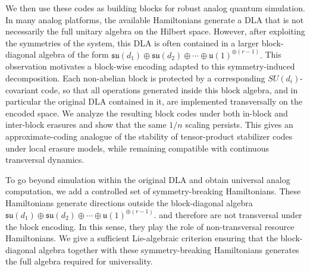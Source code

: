 \documentclass[10pt,twocolumn,superscriptaddress,aps,amsmath,amssymb,citeautoscript,floatfix,prx,longbibliography]{revtex4-2}
\newcounter{alg}
\theoremstyle{plain}
\theoremstyle{plain}
\theoremstyle{plain}
\theoremstyle{plain}
\theoremstyle{plain}
\theoremstyle{plain}
\begin{document}
We then use these codes as building blocks for robust analog quantum simulation. In many analog platforms, the available Hamiltonians generate a DLA that is not necessarily the full unitary algebra on the Hilbert space. However, after exploiting the symmetries of the system, this DLA is often contained in a larger block-diagonal algebra of the form
$
    \mathfrak{su}(d_1)\oplus\mathfrak{su}(d_2)\oplus\cdots
    \oplus \mathfrak{u}(1)^{\oplus(r-1)}.
$
This observation motivates a block-wise encoding adapted to this symmetry-induced decomposition. Each non-abelian block is protected by a corresponding \(SU(d_i)\)-covariant code, so that all operations generated inside this block algebra, and in particular the original DLA contained in it, are implemented transversally on the encoded space. We analyze the resulting block
codes under both in-block and inter-block erasures and show that the same \(1/n\) scaling persists. This gives an approximate-coding analogue of the stability of tensor-product stabilizer codes under local erasure models, while remaining compatible with continuous transversal dynamics.

To go beyond simulation within the original DLA and obtain universal analog computation, we add a controlled set of symmetry-breaking Hamiltonians. These Hamiltonians generate directions outside the block-diagonal algebra
$
    \mathfrak{su}(d_1)\oplus\mathfrak{su}(d_2)\oplus\cdots
    \oplus \mathfrak{u}(1)^{\oplus(r-1)}.
$
and therefore are not transversal under the block encoding. In this sense, they play the role of non-transversal resource Hamiltonians. We give a sufficient Lie-algebraic criterion ensuring that the block-diagonal algebra together with these symmetry-breaking Hamiltonians generates the full algebra required for universality.
\end{document}
